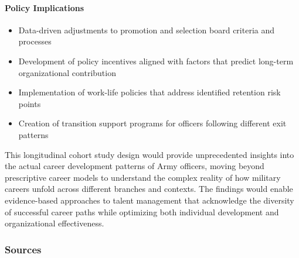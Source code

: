 \documentclass[./main.tex]{subfiles}
\begin{document}
\paragraph{Policy Implications}\label{policy-implications}

\begin{itemize}
\tightlist
\item
  Data-driven adjustments to promotion and selection board criteria and
  processes
\item
  Development of policy incentives aligned with factors that predict
  long-term organizational contribution
\item
  Implementation of work-life policies that address identified retention
  risk points
\item
  Creation of transition support programs for officers following
  different exit patterns
\end{itemize}

This longitudinal cohort study design would provide unprecedented
insights into the actual career development patterns of Army officers,
moving beyond prescriptive career models to understand the complex
reality of how military careers unfold across different branches and
contexts. The findings would enable evidence-based approaches to talent
management that acknowledge the diversity of successful career paths
while optimizing both individual development and organizational
effectiveness.

\subsubsection{Sources}\label{sources}
\end{document}
